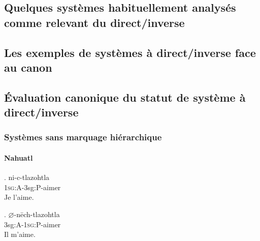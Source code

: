 \subsection[Exemples de direct/inverse]{Quelques systèmes habituellement analysés comme relevant du direct/inverse}


\subsection[Décalages par rapport au canon]{Les exemples de systèmes à direct/inverse face au canon}

\subsection[Évaluation du direct/inverse]{Évaluation canonique du statut de système à direct/inverse}
\begin{frame}
\frametitle{Systèmes sans marquage hiérarchique}
\framesubtitle{Nahuatl}

\NoAutoSpaceBeforeFDP

\ex. ni-c-tlazohtla \\
1\textsc{sg}:A-3sg:P-aimer \\
Je l'aime.


\ex. $\varnothing$-n\=ech-tlazohtla \\
3sg:A-1\textsc{sg}:P-aimer \\
Il m'aime.

\AutoSpaceBeforeFDP

\end{frame}


